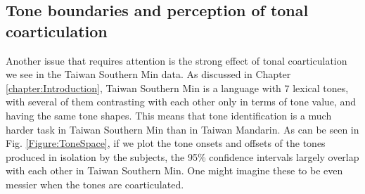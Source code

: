 \subsection{Tone boundaries and perception of tonal coarticulation}\label{section:Tone boundaries and perception of tonal coarticulation}
Another issue that requires attention is the strong effect of tonal coarticulation we see in the Taiwan Southern Min data. As discussed in Chapter \ref{chapter:Introduction}, Taiwan Southern Min is a language with 7 lexical tones, with several of them contrasting with each other only in terms of tone value, and having the same tone shapes. This means that tone identification is a much harder task in Taiwan Southern Min than in Taiwan Mandarin. As can be seen in Fig. \ref{Figure:ToneSpace}, if we plot the tone onsets and offsets of the tones produced in isolation by the subjects, the 95\% confidence intervals largely overlap with each other in Taiwan Southern Min. One might imagine these to be even messier when the tones are coarticulated.
